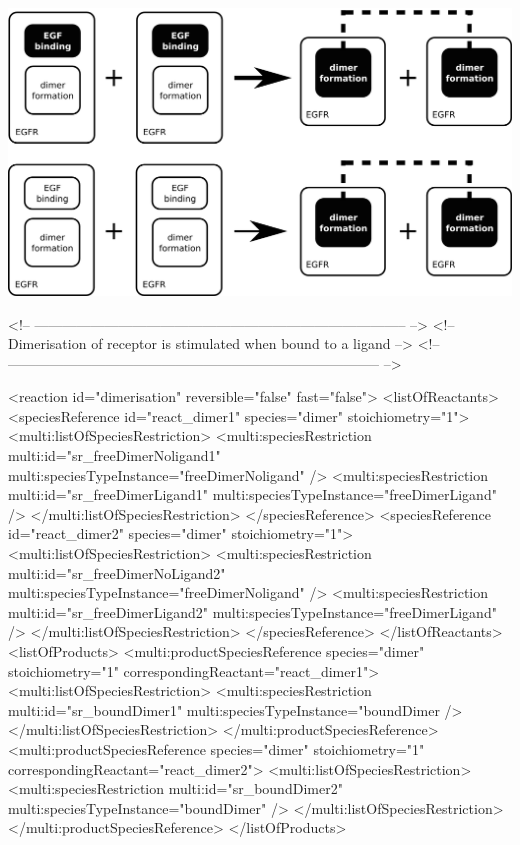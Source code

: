 \includegraphics[scale=0.8]{figs/pngs/dimerisation.png}

\begin{example}
<!-- -------------------------------------------------------------------------------- -->
<!-- Dimerisation of receptor is stimulated when bound to a ligand                    -->
<!-- -------------------------------------------------------------------------------- -->

       <reaction id="dimerisation" reversible="false" fast="false"> 
        <listOfReactants>
          <speciesReference id="react_dimer1" species="dimer" stoichiometry="1">
            <multi:listOfSpeciesRestriction>
              <multi:speciesRestriction multi:id="sr_freeDimerNoligand1" 
                                        multi:speciesTypeInstance="freeDimerNoligand" />
              <multi:speciesRestriction multi:id="sr_freeDimerLigand1" 
                                        multi:speciesTypeInstance="freeDimerLigand" />
            </multi:listOfSpeciesRestriction>
          </speciesReference>
          <speciesReference id="react_dimer2" species="dimer" stoichiometry="1">
            <multi:listOfSpeciesRestriction>
              <multi:speciesRestriction multi:id="sr_freeDimerNoLigand2" 
                                        multi:speciesTypeInstance="freeDimerNoligand" />
              <multi:speciesRestriction multi:id="sr_freeDimerLigand2" 
                                        multi:speciesTypeInstance="freeDimerLigand" />
            </multi:listOfSpeciesRestriction>
          </speciesReference>
        </listOfReactants>
        <listOfProducts>
          <multi:productSpeciesReference species="dimer" stoichiometry="1"
                                   correspondingReactant="react_dimer1">
            <multi:listOfSpeciesRestriction>
              <multi:speciesRestriction multi:id="sr_boundDimer1" 
                                        multi:speciesTypeInstance="boundDimer />
            </multi:listOfSpeciesRestriction>
          </multi:productSpeciesReference>
          <multi:productSpeciesReference species="dimer" stoichiometry="1"
                                   correspondingReactant="react_dimer2">
            <multi:listOfSpeciesRestriction>
              <multi:speciesRestriction multi:id="sr_boundDimer2" 
                                        multi:speciesTypeInstance="boundDimer" />
            </multi:listOfSpeciesRestriction>
          </multi:productSpeciesReference>
        </listOfProducts>


\end{example}
